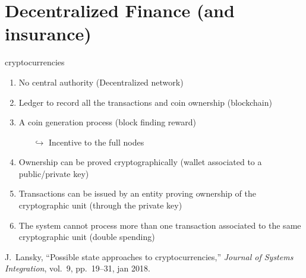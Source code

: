 \documentclass{beamer}
\begin{document}





\section{Decentralized Finance (and insurance)}

\begin{frame}{cryptocurrencies}
\begin{enumerate}
  \item No central authority (Decentralized network)
  \item Ledger to record all the transactions and coin ownership (blockchain)
  \item A coin generation process (block finding reward)
    \begin{itemize}
    \item[$\hookrightarrow$] Incentive to the full nodes 
  \end{itemize}
  \item Ownership can be proved cryptographically (wallet associated to a public/private key)
  \item Transactions can be issued by an entity proving ownership of the cryptographic unit (through the private key) 
  \item The system cannot process more than one transaction associated to the same cryptographic unit (double spending)
\end{enumerate}
\tiny
\begin{thebibliography}{1}

J.~Lansky, ``Possible state approaches to cryptocurrencies,'' {\em Journal of
  Systems Integration}, vol.~9, pp.~19--31, jan 2018.

\end{thebibliography}
\end{frame}
\end{document}
